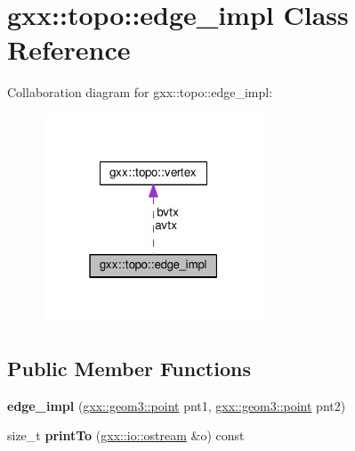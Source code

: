 \hypertarget{classgxx_1_1topo_1_1edge__impl}{}\section{gxx\+:\+:topo\+:\+:edge\+\_\+impl Class Reference}
\label{classgxx_1_1topo_1_1edge__impl}


Collaboration diagram for gxx\+:\+:topo\+:\+:edge\+\_\+impl\+:
\nopagebreak
\begin{figure}[H]
\begin{center}
\leavevmode
\includegraphics[width=187pt]{classgxx_1_1topo_1_1edge__impl__coll__graph}
\end{center}
\end{figure}
\subsection*{Public Member Functions}
\begin{DoxyCompactItemize}
\item 
{\bfseries edge\+\_\+impl} (\hyperlink{classgxx_1_1geom3_1_1point}{gxx\+::geom3\+::point} pnt1, \hyperlink{classgxx_1_1geom3_1_1point}{gxx\+::geom3\+::point} pnt2)\hypertarget{classgxx_1_1topo_1_1edge__impl_a81058d8dcd14cf9e70dfcefcdfa78c27}{}\label{classgxx_1_1topo_1_1edge__impl_a81058d8dcd14cf9e70dfcefcdfa78c27}

\item 
size\+\_\+t {\bfseries print\+To} (\hyperlink{classgxx_1_1io_1_1ostream}{gxx\+::io\+::ostream} \&o) const \hypertarget{classgxx_1_1topo_1_1edge__impl_af4526f6edd804684fa5a607cbfb6ee29}{}\label{classgxx_1_1topo_1_1edge__impl_af4526f6edd804684fa5a607cbfb6ee29}

\end{DoxyCompactItemize}
